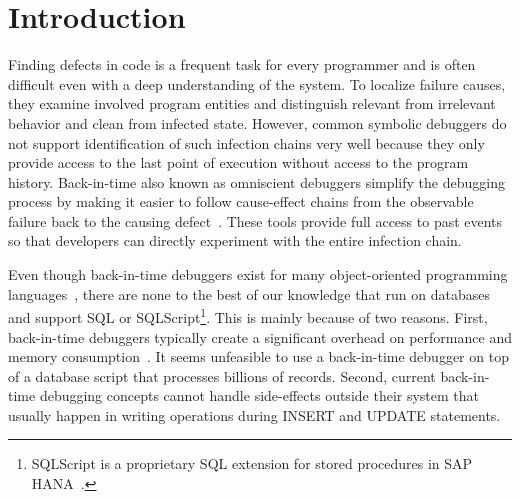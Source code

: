 \documentclass[english,conference]{IEEEtran}
\begin{document}


\section{Introduction}

Finding defects in code is a frequent task for every programmer and is often difficult even with a deep understanding of the system.
To localize failure causes, they examine involved program entities and distinguish relevant from irrelevant behavior and clean from infected state. 
However, common symbolic debuggers do not support identification of such infection chains very well because they only provide access to the last point of execution without access to the program history.
Back-in-time also known as omniscient debuggers simplify the debugging process by making it easier to follow cause-effect chains from the observable failure back to the causing defect~\cite{lewis_debugging_2003}.
These tools provide full access to past events so that developers can directly experiment with the entire infection chain. 

Even though back-in-time debuggers exist for many object-oriented programming languages~\cite{feldman_igor:_1988,hofer_design_2006,lewis_debugging_2003}, there are none to the best of our knowledge that run on databases and support SQL or SQLScript\footnote{SQLScript is a proprietary SQL extension for stored procedures in SAP HANA~\cite{sqlScript}.}.
This is mainly because of two reasons. 
First, back-in-time debuggers typically create a significant overhead on performance and memory consumption~\cite{lewis_debugging_2003,lienhard_practical_2008,pothier_scalable_2007}.
It seems unfeasible to use a back-in-time debugger on top of a database script that processes billions of records.
Second, current back-in-time debugging concepts cannot handle side-effects outside their system that usually happen in writing operations during INSERT and UPDATE statements. 
\end{document}
